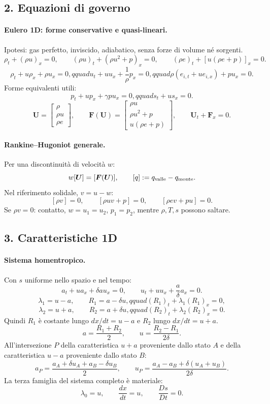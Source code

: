 \documentclass[11pt,a4paper]{article}
\begin{document}
\subsection*{2. Equazioni di governo}

\paragraph*{Eulero 1D: forme conservative e quasi-lineari.}
Ipotesi: gas perfetto, inviscido, adiabatico, senza forze di volume né sorgenti.
\[
\rho_t+(\rho u)_x=0,
\qquad
(\rho u)_t+(\rho u^2+p)_x=0,
\qquad
(\rho e)_t+[u(\rho e+p)]_x=0.
\]
\[
\rho_t+u\rho_x+\rho u_x=0,qquad
u_t+uu_x+\frac1\rho p_x=0,qquad
\rho\left(e_{i,t}+u e_{i,x}\right)+pu_x=0.
\]
Forme equivalenti utili:
\[
p_t+up_x+\gamma p u_x=0,qquad
s_t+us_x=0.
\]
\[
\boldsymbol U=
\begin{bmatrix}\rho\\ \rho u\\ \rho e\end{bmatrix},\qquad
\boldsymbol F(\boldsymbol U)=
\begin{bmatrix}\rho u\\ \rho u^2+p\\ u(\rho e+p)\end{bmatrix},\qquad
\boldsymbol U_t+\boldsymbol F_x=0.
\]

\paragraph*{Rankine--Hugoniot generale.}
Per una discontinuità di velocità $w$:
\[
w[\boldsymbol U]=[\boldsymbol F(\boldsymbol U)],
\qquad [q]:=q_{\rm valle}-q_{\rm monte}.
\]
Nel riferimento solidale, $v=u-w$:
\[
[\rho v]=0,\qquad [\rho uv+p]=0,\qquad [\rho ev+pu]=0.
\]
Se $\rho v=0$: contatto, $w=u_1=u_2$, $p_1=p_2$, mentre $\rho,T,s$ possono saltare.

\subsection*{3. Caratteristiche 1D}

\paragraph*{Sistema homentropico.}
Con $s$ uniforme nello spazio e nel tempo:
\[
a_t+ua_x+\delta a u_x=0,
\qquad
u_t+uu_x+\frac a\delta a_x=0.
\]
\[
\lambda_1=u-a,\qquad R_1=a-\delta u,qquad
(R_1)_t+\lambda_1(R_1)_x=0,
\]
\[
\lambda_2=u+a,\qquad R_2=a+\delta u,qquad
(R_2)_t+\lambda_2(R_2)_x=0.
\]
Quindi $R_1$ è costante lungo $dx/dt=u-a$ e $R_2$ lungo $dx/dt=u+a$.
\[
a=\frac{R_1+R_2}{2},\qquad u=\frac{R_2-R_1}{2\delta}.
\]
All'intersezione $P$ della caratteristica $u+a$ proveniente dallo stato $A$ e della
caratteristica $u-a$ proveniente dallo stato $B$:
\[
a_P=\frac{a_A+\delta u_A+a_B-\delta u_B}{2},\qquad
u_P=\frac{a_A-a_B+\delta(u_A+u_B)}{2\delta}.
\]
La terza famiglia del sistema completo è materiale:
\[
\lambda_0=u,\qquad \frac{dx}{dt}=u,\qquad \frac{Ds}{Dt}=0.
\]
\end{document}
